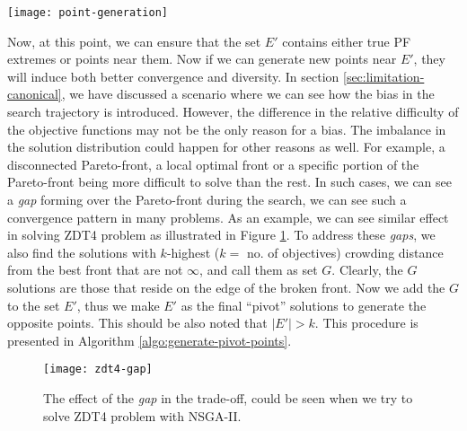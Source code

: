 \documentclass[journal]{IEEEtran}
\let\MYoriglatexcaption\caption
\renewcommand{\caption}[2][\relax]{\MYoriglatexcaption[#2]{#2}}
\begin{document}
\begin{figure*}[!hbp]
	\centering
	\texttt{[image: point-generation]}
	\caption{The illustration of lines 9--12 in Algorithm \ref{algo:onsga2}. The right axes are the variable space and the left axes are the corresponding objective space. The point \(\mathbf{x_c}\) is the child (black circle) and \(\mathbf{x_p}\) is the parent (white circle). The point \(\mathbf{v}\) are the pivot points (grey circles). The operation will choose one of the directions denoted by \(L_1\), \(L_2\) or \(L_3\). If \(\mathbf{x_c}\) violates the variable bound then it is reverted back to the vicinity of the corresponding pivot point \(\mathbf{v}\).}
	\label{fig:opposite-creation}
\end{figure*}
%
Now, at this point, we can ensure that the set \(E'\) contains either true PF extremes or points near them. Now if we can generate new points near \(E'\), they will induce both better convergence and diversity. In section \ref{sec:limitation-canonical}, we have discussed a scenario where we can see how the bias in the search trajectory is introduced. However, the difference in the relative difficulty of the objective functions may not be the only reason for a bias. The imbalance in the solution distribution could happen for other reasons as well. For example, a disconnected Pareto-front, a local optimal front or a specific portion of the Pareto-front being more difficult to solve than the rest. In such cases, we can see a \textit{gap} forming over the Pareto-front during the search, we can see such a convergence pattern in many problems. As an example, we can see similar effect in solving ZDT4 problem as illustrated in Figure \ref{fig:zdt4-gap-snapshot}. To address these \textit{gaps}, we also find the solutions with \(k\)-highest (\(k = \) no. of objectives) crowding distance from the best front that are not \(\infty\), and call them as set \(G\). Clearly, the \(G\) solutions are those that reside on the edge of the broken front. Now we add the \(G\) to the set \(E'\), thus we make \(E'\) as the final ``pivot'' solutions to generate the opposite points. This should be also noted that \(|E'| > k\). This procedure is presented in Algorithm \ref{algo:generate-pivot-points}.
\begin{figure}[tp]
	\centering
	\texttt{[image: zdt4-gap]}
	\caption{The effect of the \textit{gap} in the trade-off, could be seen when we try to solve ZDT4 problem with NSGA-II.}
	\label{fig:zdt4-gap-snapshot}
\end{figure}
%
%
\end{document}
